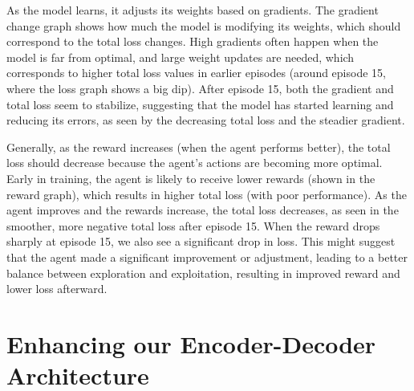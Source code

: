 \documentclass[a4paper,11pt]{article}
\begin{document}
As the model learns, it adjusts its weights based on gradients. The gradient change graph shows how much the model is modifying its weights, which should correspond to the total loss changes. High gradients often happen when the model is far from optimal, and large weight updates are needed, which corresponds to higher total loss values in earlier episodes (around episode 15, where the loss graph shows a big dip). After episode 15, both the gradient and total loss seem to stabilize, suggesting that the model has started learning and reducing its errors, as seen by the decreasing total loss and the steadier gradient. 

Generally, as the reward increases (when the agent performs better), the total loss should decrease because the agent's actions are becoming more optimal. Early in training, the agent is likely to receive lower rewards (shown in the reward graph), which results in higher total loss (with poor performance). As the agent improves and the rewards increase, the total loss decreases, as seen in the smoother, more negative total loss after episode 15. When the reward drops sharply at episode 15, we also see a significant drop in loss. This might suggest that the agent made a significant improvement or adjustment, leading to a better balance between exploration and exploitation, resulting in improved reward and lower loss afterward. 

\section{Enhancing our Encoder-Decoder Architecture }
\end{document}
